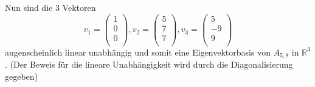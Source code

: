 \documentclass{scrreprt}
\begin{document}
\begin{enumerate}[(a)]
  \newpage
  Nun sind die 3 Vektoren
  \[
    v_1 = \begin{pmatrix}
      1 \\
      0 \\
      0 \\
    \end{pmatrix}, v_2 = \begin{pmatrix}
      5 \\
      7 \\
      7 \\
    \end{pmatrix}, v_3 = \begin{pmatrix}
      5  \\
      -9 \\
      9  \\
    \end{pmatrix}
  \]
  augenscheinlich linear unabhängig und somit eine Eigenvektorbasis von
  $A_{5, 8}$ in $\mathbb{R}^3$.
  (Der Beweis für die lineare Unabhängigkeit wird durch die Diagonalisierung
  gegeben)


\end{enumerate}
\end{document}
